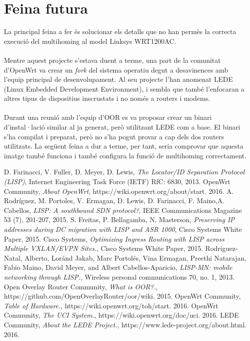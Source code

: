 \documentclass[11pt]{article}
\begin{document}
\section{Feina futura}
La principal feina a fer és solucionar els detalls que no han permès la correcta execució del multihoming al model Linksys WRT1200AC.\\
\\
Mentre aquest projecte s'estava duent a terme, una part de la comunitat d'OpenWrt va crear un \textit{fork} del sistema operatiu degut a desavinences amb l'equip principal de desenvolupament. Al seu projecte l'han anomenat LEDE (Linux Embedded Development Environment), i sembla que també l'enfocaran a altres tipus de dispositius inscrustats i no només a routers i modems\cite{lede16}.\\
\\
Durant una reunió amb l'equip d'OOR es va proposar crear un binari d'instal·lació similar al ja generat, però utilitzant LEDE com a base. El binari s'ha compilat i preparat, però no s'ha pogut provar a cap dels dos routers utilitzats. La següent feina a dur a terme, per tant, seria comprovar que aquesta imatge també funciona i també configura la funció de multihoming correctament.


\begin{thebibliography}{9}

  D. Farinacci, V. Fuller, D. Meyer, D. Lewis,
  \emph{The Locator/ID Separation Protocol (LISP)},
  Internet Engineering Task Force (IETF) RfC: 6830,
  2013.
  OpenWrt Community,
  \emph{About OpenWrt},
  https://wiki.openwrt.org/about/start.
  2016.
  A. Rodríguez, M. Portoles, V. Ermagan, D. Lewis, D. Farinacci, F. Maino,A. Cabellos,
  \emph{LISP: A southbound SDN protocol?},
  IEEE Communications Magazine 53 (7), 201-207,
  2015.
  S. Freitas, P. Bellagamba, N. Masterson,
  \emph{Preserving IP addresses during DC migration with LISP and ASR 1000},
  Cisco Systems White Paper,
  2015.
  Cisco Systems,
  \emph{Optimizing Ingress Routing with LISP across Multiple VXLAN/EVPN Sites.},
  Cisco Systems White Paper,
  2015.
  Rodriguez-Natal, Alberto, Loránd Jakab, Marc Portolés, Vina Ermagan, Preethi Natarajan, Fabio Maino, David Meyer, and Albert Cabellos-Aparicio,
  \emph{LISP-MN: mobile networking through LISP.},
  Wireless personal communications 70, no. 1,
  2013.
  Open Overlay Router Community,
  \emph{What is OOR?.},
	https://github.com/OpenOverlayRouter/oor/wiki.
	2015.
  OpenWrt Community,
  \emph{Table of Hardware.},
	https://wiki.openwrt.org/toh/start.
	2016.
  OpenWrt Community,
  \emph{The UCI System.},
	https://wiki.openwrt.org/doc/uci.
	2016.
  LEDE Community,
  \emph{About the LEDE Project.},
	https://www.lede-project.org/about.html.
	2016.
	
\end{thebibliography}
\end{document}
